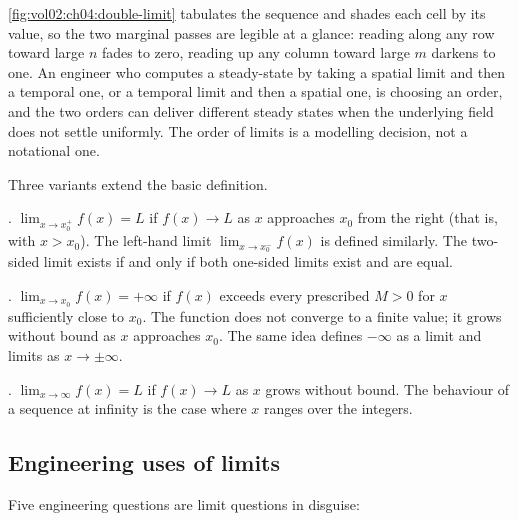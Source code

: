 

\autoref{fig:vol02:ch04:double-limit} tabulates the sequence and shades
each cell by its value, so the two marginal passes are legible at a
glance: reading along any row toward large $n$ fades to zero, reading up
any column toward large $m$ darkens to one. An engineer who computes a
steady-state by taking a spatial limit and then a temporal one, or a
temporal limit and then a spatial one, is choosing an order, and the two
orders can deliver different steady states when the underlying field does
not settle uniformly. The order of limits is a modelling decision, not a
notational one.

Three variants extend the basic definition.

. $\lim_{x \to x_{0}^{+}} f(x) = L$ if $f(x)
\to L$ as $x$ approaches $x_{0}$ from the right (that is, with
$x > x_{0}$). The left-hand limit $\lim_{x \to x_{0}^{-}} f(x)$ is
defined similarly. The two-sided limit exists if and only if both
one-sided limits exist and are equal.

. $\lim_{x \to x_{0}} f(x) = +\infty$ if $f(x)$
exceeds every prescribed $M > 0$ for $x$ sufficiently close to $x_{0}$.
The function does not converge to a finite value; it grows without
bound as $x$ approaches $x_{0}$. The same idea defines $-\infty$ as a
limit and limits as $x \to \pm \infty$.

. $\lim_{x \to \infty} f(x) = L$ if $f(x)
\to L$ as $x$ grows without bound. The behaviour of a sequence at
infinity is the case where $x$ ranges over the integers.

\subsection{Engineering uses of limits}

Five engineering questions are limit questions in disguise:

